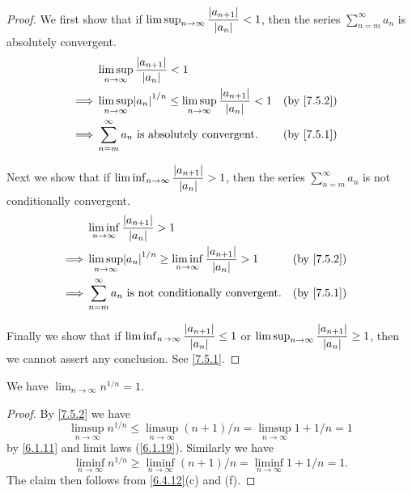 \begin{proof}
  We first show that if \(\limsup_{n \to \infty} \dfrac{\left\lvert a_{n + 1}\right\rvert}{\left\lvert a_n\right\rvert} < 1\), then the series \(\sum_{n = m}^\infty a_n\) is absolutely convergent.
  \begin{align*}
             & \limsup_{n \to \infty} \dfrac{\abs{a_{n + 1}}}{\abs{a_n}} < 1                                                                             \\
    \implies & \limsup_{n \to \infty} \abs{a_n}^{1 / n} \leq \limsup_{n \to \infty} \dfrac{\abs{a_{n + 1}}}{\abs{a_n}} < 1 &  & \text{(by \cref{7.5.2})} \\
    \implies & \sum_{n = m}^\infty a_n \text{ is absolutely convergent}.                                                   &  & \text{(by \cref{7.5.1})}
  \end{align*}

  Next we show that if \(\liminf_{n \to \infty} \dfrac{\left\lvert a_{n + 1}\right\rvert}{\left\lvert a_n\right\rvert} > 1\), then the series \(\sum_{n = m}^\infty a_n\) is not conditionally convergent.
  \begin{align*}
             & \liminf_{n \to \infty} \dfrac{\abs{a_{n + 1}}}{\abs{a_n}} > 1                                                                             \\
    \implies & \limsup_{n \to \infty} \abs{a_n}^{1 / n} \geq \liminf_{n \to \infty} \dfrac{\abs{a_{n + 1}}}{\abs{a_n}} > 1 &  & \text{(by \cref{7.5.2})} \\
    \implies & \sum_{n = m}^\infty a_n \text{ is not conditionally convergent}.                                            &  & \text{(by \cref{7.5.1})}
  \end{align*}

  Finally we show that if \(\liminf_{n \to \infty} \dfrac{\left\lvert a_{n + 1}\right\rvert}{\left\lvert a_n\right\rvert} \leq 1\) or \(\limsup_{n \to \infty} \dfrac{\left\lvert a_{n + 1}\right\rvert}{\left\lvert a_n\right\rvert} \geq 1\), then we cannot assert any conclusion.
  See \cref{7.5.1}.
\end{proof}

\begin{prop}\label{7.5.4}
  We have \(\lim_{n \to \infty} n^{1 / n} = 1\).
\end{prop}

\begin{proof}
  By \cref{7.5.2} we have
  \[
    \limsup_{n \to \infty} n^{1 / n} \leq \limsup_{n \to \infty} (n + 1) / n = \limsup_{n \to \infty} 1 + 1 / n = 1
  \]
  by \cref{6.1.11} and limit laws (\cref{6.1.19}).
  Similarly we have
  \[
    \liminf_{n \to \infty} n^{1 / n} \geq \liminf_{n \to \infty} (n + 1) / n = \liminf_{n \to \infty} 1 + 1 / n = 1.
  \]
  The claim then follows from \cref{6.4.12}(c) and (f).
\end{proof}


